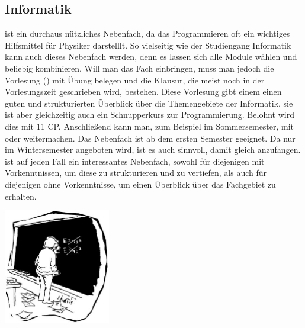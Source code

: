 \subsection{Informatik}


 ist ein durchaus nützliches Nebenfach, da das Programmieren oft ein wichtiges Hilfsmittel
für Physiker darstelllt. 
So vielseitig wie der Studiengang Informatik kann auch dieses Nebenfach werden, 
denn es lassen sich alle Module wählen und beliebig kombinieren. 
Will man das Fach einbringen, muss man jedoch die Vorlesung  ()
mit Übung belegen und die Klausur, die meist noch in der Vorlesungszeit geschrieben wird, bestehen.
Diese Vorlesung gibt einem einen guten und strukturierten Überblick über die Themengebiete der Informatik, 
sie ist aber gleichzeitig auch ein Schnupperkurs zur Programmierung.
Belohnt wird dies mit 11 CP.
Anschließend kann man, zum Beispiel im Sommersemester,
mit  oder  weitermachen.
Das Nebenfach ist ab dem ersten Semester geeignet.
Da  nur im Wintersemester angeboten wird, ist es auch sinnvoll, damit gleich anzufangen.
 ist auf jeden Fall ein interessantes Nebenfach, sowohl für diejenigen mit Vorkenntnissen,
um diese zu strukturieren und zu vertiefen, als auch für diejenigen ohne Vorkenntnisse,
um einen Überblick über das Fachgebiet zu erhalten.

\begin{center}

  \includegraphics[width=0.35\textwidth]{bilder/einstein.jpg}

\end{center}
